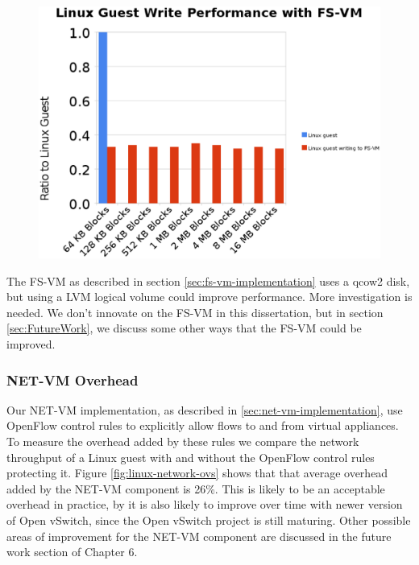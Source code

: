 \begin{figure}[tbp]
\begin{centering}
\label{fig:fs-vm-write}
\includegraphics[scale=.7,angle=90]{figs/fs-vm-write}
\end{centering}
\end{figure}

The FS-VM as described in section \ref{sec:fs-vm-implementation} uses a qcow2 disk, but using a LVM logical volume could improve performance. More investigation is needed. We don't innovate on the FS-VM in this dissertation, but in section \ref{sec:FutureWork}, we discuss some other ways that the FS-VM could be improved.

\subsubsection{NET-VM Overhead}

Our NET-VM implementation, as described in \ref{sec:net-vm-implementation}, use OpenFlow control rules to explicitly allow flows to and from virtual appliances. To measure the overhead added by these rules we compare the network throughput of a Linux guest with and without the OpenFlow control rules protecting it. Figure \ref{fig:linux-network-ovs} shows that that average overhead added by the NET-VM component is 26\%. This is likely to be an acceptable overhead in practice, by it is also likely to improve over time with newer version of Open vSwitch, since the Open vSwitch project is still maturing. Other possible areas of improvement for the NET-VM component are discussed in the future work section of Chapter 6.

